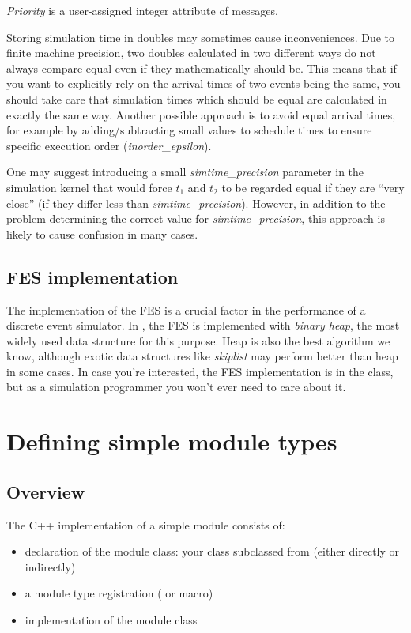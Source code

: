 \textit{Priority} is a user-assigned integer
attribute of messages.

Storing simulation time in doubles may sometimes cause inconveniences.
Due to finite machine precision, two doubles calculated in two
different ways do not always compare equal even if they mathematically
should be. This means that if you want to explicitly rely on the
arrival times of two events being the same, you should take care that
simulation times which should be equal are calculated in exactly the
same way. Another possible approach is to avoid equal arrival times,
for example by adding/subtracting small values to schedule times to
ensure specific execution order
(\textit{inorder\_epsilon}).


One may suggest introducing a small \textit{simtime\_precision} parameter in
the simulation kernel that would force $t_{1}$ and $t_{2}$ to be regarded
equal if they are ``very close'' (if they differ
less than \textit{simtime\_precision}). However, in addition to the problem
determining the correct value for \textit{simtime\_precision},
this approach is likely to cause confusion in many cases.



\subsection{FES implementation}

The implementation of the FES is a crucial factor in the
performance of a discrete event simulator. In {\opp}, the FES is
implemented with \textit{binary heap}, the most
widely used data structure for this purpose. Heap is also the best
algorithm we know, although exotic data structures like
\textit{skiplist} may perform better than heap in some
cases. In case you're interested, the FES implementation is in the
 class, but as a simulation programmer you won't
ever need to care about it.


\section{Defining simple module types}

\subsection{Overview}

The C++ implementation of a simple module consists of:
\begin{itemize}
\item{declaration of the module class: your class subclassed from 
(either directly or indirectly)}
\item{a module type registration ( or
     macro)}
\item{implementation of the module class}
\end{itemize}


